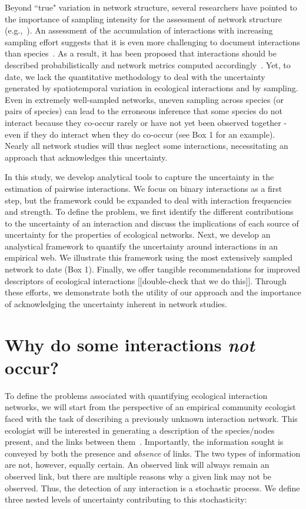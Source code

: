 \documentclass[12pt]{article}
\begin{document}
    Beyond ``true" variation in network structure, several researchers have pointed to the importance of sampling intensity for the assessment of network structure (e.g.,~\citealp{Martinez1999,Bluthgen2006,Bluthgen2007}). An assessment of the accumulation of interactions with increasing sampling effort suggests that it is even more challenging to document interactions than species~\citep{Poisot2012}. As a result, it has been proposed that interactions should be described probabilistically and network metrics computed accordingly~\citep{Poisot2016}. Yet, to date, we lack the quantitative methodology to deal with the uncertainty generated by spatiotemporal variation in ecological interactions and by sampling. Even in extremely well-sampled networks, uneven sampling across species (or pairs of species) can lead to the erroneous inference that some species do not interact because they co-occur rarely or have not yet been observed together - even if they do interact when they do co-occur (see Box 1 for an example). Nearly all network studies will thus neglect some interactions, necessitating an approach that acknowledges this uncertainty.


    In this study, we develop analytical tools to capture the uncertainty in the estimation of pairwise interactions. We focus on binary interactions as a first step, but the framework could be expanded to deal with interaction frequencies and strength. To define the problem, we first identify the different contributions to the uncertainty of an interaction and discuss the implications of each source of uncertainty for the properties of ecological networks. Next, we develop an analystical framework to quantify the uncertainty around interactions in an empirical web. We illustrate this framework using the most extensively sampled network to date (Box 1).  Finally, we offer tangible recommendations for improved descriptors of ecological interactions [[double-check that we do this]]. Through these efforts, we demonstrate both the utility of our approach and the importance of acknowledging the uncertainty inherent in network studies.


\section*{Why do some interactions \emph{not} occur?}

  To define the problems associated with quantifying ecological interaction networks, we will start from the perspective of an empirical community ecologist faced with the task of describing a previously unknown interaction network. This ecologist will be interested in generating a description of the species/nodes present, and the links between them~\citep{Roslin2016}.  Importantly, the information sought is conveyed by both the presence and \emph{absence} of links. The two types of information are not, however, equally certain. An observed link will always remain an observed link, but there are multiple reasons why a given link may not be observed. Thus, the detection of any interaction is a stochastic process. We define three nested levels of uncertainty contributing to this stochasticity:
\end{document}
